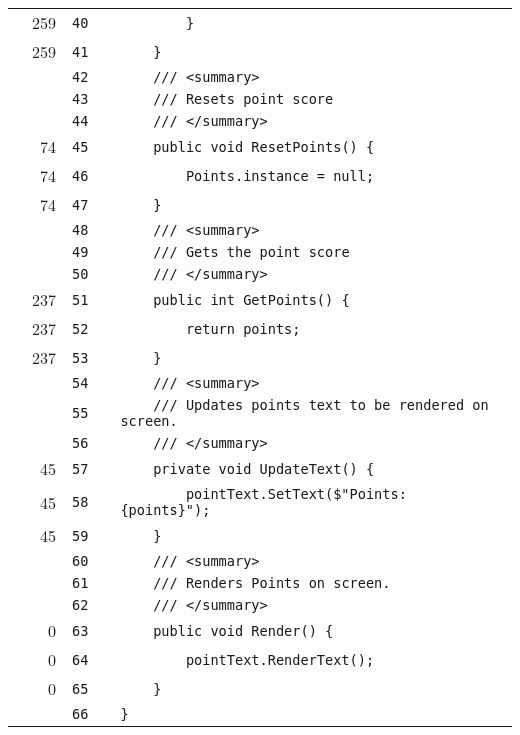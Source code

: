 \documentclass[a4paper,landscape,10pt]{article}
\begin{document}
\begin{longtable}[l]{lrrll}
\cellcolor{green} & 259 & \verb~40~ & & \verb~        }~\\
\cellcolor{green} & 259 & \verb~41~ & & \verb~    }~\\
\cellcolor{gray} &  & \verb~42~ & & \verb~    /// <summary>~\\
\cellcolor{gray} &  & \verb~43~ & & \verb~    /// Resets point score~\\
\cellcolor{gray} &  & \verb~44~ & & \verb~    /// </summary>~\\
\cellcolor{green} & 74 & \verb~45~ & & \verb~    public void ResetPoints() {~\\
\cellcolor{green} & 74 & \verb~46~ & & \verb~        Points.instance = null;~\\
\cellcolor{green} & 74 & \verb~47~ & & \verb~    }~\\
\cellcolor{gray} &  & \verb~48~ & & \verb~    /// <summary>~\\
\cellcolor{gray} &  & \verb~49~ & & \verb~    /// Gets the point score~\\
\cellcolor{gray} &  & \verb~50~ & & \verb~    /// </summary>~\\
\cellcolor{green} & 237 & \verb~51~ & & \verb~    public int GetPoints() {~\\
\cellcolor{green} & 237 & \verb~52~ & & \verb~        return points;~\\
\cellcolor{green} & 237 & \verb~53~ & & \verb~    }~\\
\cellcolor{gray} &  & \verb~54~ & & \verb~    /// <summary>~\\
\cellcolor{gray} &  & \verb~55~ & & \verb~    /// Updates points text to be rendered on screen.~\\
\cellcolor{gray} &  & \verb~56~ & & \verb~    /// </summary>~\\
\cellcolor{green} & 45 & \verb~57~ & & \verb~    private void UpdateText() {~\\
\cellcolor{green} & 45 & \verb~58~ & & \verb~        pointText.SetText($"Points: {points}");~\\
\cellcolor{green} & 45 & \verb~59~ & & \verb~    }~\\
\cellcolor{gray} &  & \verb~60~ & & \verb~    /// <summary>~\\
\cellcolor{gray} &  & \verb~61~ & & \verb~    /// Renders Points on screen.~\\
\cellcolor{gray} &  & \verb~62~ & & \verb~    /// </summary>~\\
\cellcolor{red} & 0 & \verb~63~ & & \verb~    public void Render() {~\\
\cellcolor{red} & 0 & \verb~64~ & & \verb~        pointText.RenderText();~\\
\cellcolor{red} & 0 & \verb~65~ & & \verb~    }~\\
\cellcolor{gray} &  & \verb~66~ & & \verb~}~\\
\end{longtable}
\newpage
\end{document}
